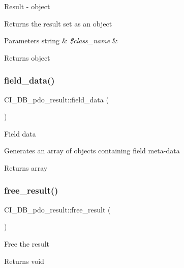Result -\/ object

Returns the result set as an object


\begin{DoxyParams}[1]{Parameters}
string & {\em \$class\+\_\+name} & \\
\hline
\end{DoxyParams}
\begin{DoxyReturn}{Returns}
object 
\end{DoxyReturn}
\mbox{\label{class_c_i___d_b__pdo__result_a03bb33642803f7f2d37ee4cd80ea55b9}} 
\subsubsection{\texorpdfstring{field\+\_\+data()}{field\_data()}}
{\footnotesize\ttfamily C\+I\+\_\+\+D\+B\+\_\+pdo\+\_\+result\+::field\+\_\+data (\begin{DoxyParamCaption}{ }\end{DoxyParamCaption})}

Field data

Generates an array of objects containing field meta-\/data

\begin{DoxyReturn}{Returns}
array 
\end{DoxyReturn}
\mbox{\label{class_c_i___d_b__pdo__result_a6f4c555dade73a89619a2718bf9c4f38}} 
\subsubsection{\texorpdfstring{free\+\_\+result()}{free\_result()}}
{\footnotesize\ttfamily C\+I\+\_\+\+D\+B\+\_\+pdo\+\_\+result\+::free\+\_\+result (\begin{DoxyParamCaption}{ }\end{DoxyParamCaption})}

Free the result

\begin{DoxyReturn}{Returns}
void 
\end{DoxyReturn}
\mbox{\label{class_c_i___d_b__pdo__result_af29d372702b1ed462d347290f6915c5a}} 

